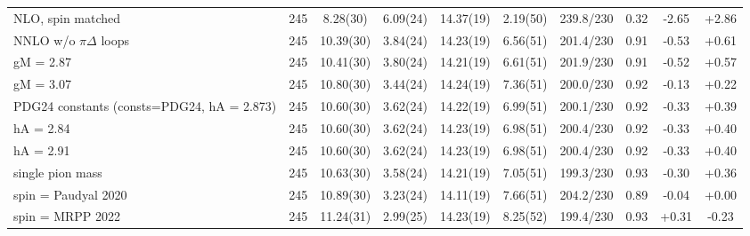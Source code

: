 \begin{tabular}{lccccccccc}
NLO, spin matched & 245 & 8.28(30) & 6.09(24) & 14.37(19) & 2.19(50) & 239.8/230 & 0.32 & -2.65 & +2.86 \\
NNLO w/o $\pi\Delta$ loops & 245 & 10.39(30) & 3.84(24) & 14.23(19) & 6.56(51) & 201.4/230 & 0.91 & -0.53 & +0.61 \\
gM = 2.87 & 245 & 10.41(30) & 3.80(24) & 14.21(19) & 6.61(51) & 201.9/230 & 0.91 & -0.52 & +0.57 \\
gM = 3.07 & 245 & 10.80(30) & 3.44(24) & 14.24(19) & 7.36(51) & 200.0/230 & 0.92 & -0.13 & +0.22 \\
PDG24 constants (consts=PDG24, hA = 2.873) & 245 & 10.60(30) & 3.62(24) & 14.22(19) & 6.99(51) & 200.1/230 & 0.92 & -0.33 & +0.39 \\
hA = 2.84 & 245 & 10.60(30) & 3.62(24) & 14.23(19) & 6.98(51) & 200.4/230 & 0.92 & -0.33 & +0.40 \\
hA = 2.91 & 245 & 10.60(30) & 3.62(24) & 14.23(19) & 6.98(51) & 200.4/230 & 0.92 & -0.33 & +0.40 \\
single pion mass & 245 & 10.63(30) & 3.58(24) & 14.21(19) & 7.05(51) & 199.3/230 & 0.93 & -0.30 & +0.36 \\
spin = Paudyal 2020 & 245 & 10.89(30) & 3.23(24) & 14.11(19) & 7.66(51) & 204.2/230 & 0.89 & -0.04 & +0.00 \\
spin = MRPP 2022 & 245 & 11.24(31) & 2.99(25) & 14.23(19) & 8.25(52) & 199.4/230 & 0.93 & +0.31 & -0.23 \\
\hline
\end{tabular}

